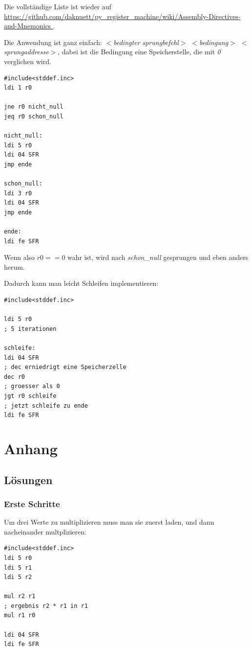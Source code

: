 \documentclass[a4paper,12pt,oneside]{scrreprt}
\begin{document}
Die vollständige Liste ist wieder auf \url{https://github.com/daknuett/py_register_machine/wiki/Assembly-Directives-and-Mnemonics }.

Die Anwendung ist ganz einfach: \textit{$<$bedingter sprungbefehl$>$ $<$bedingung$>$ $<$sprungaddresse$>$}, dabei ist die Bedingung eine Speicherstelle, die mit \textit{0} verglichen wird.

\begin{lstlisting}[frame=single]
#include<stddef.inc>
ldi 1 r0

jne r0 nicht_null
jeq r0 schon_null

nicht_null:
ldi 5 r0
ldi 04 SFR
jmp ende

schon_null:
ldi 3 r0
ldi 04 SFR
jmp ende

ende:
ldi fe SFR
\end{lstlisting}

Wenn also $r0 == 0$ wahr ist, wird nach \textit{schon\_null} gesprungen und eben anders herum.

Dadurch kann man leicht Schleifen implementieren:

\begin{lstlisting}[frame=single]
#include<stddef.inc>

ldi 5 r0
; 5 iterationen

schleife:
ldi 04 SFR
; dec erniedrigt eine Speicherzelle
dec r0
; groesser als 0
jgt r0 schleife
; jetzt schleife zu ende
ldi fe SFR
\end{lstlisting}



\part{Anhang}

\chapter{Lösungen}
\section{Erste Schritte}

Um drei Werte zu multiplizieren muss man sie zuerst laden, und dann nacheinander multplizieren:

\begin{lstlisting}[frame=single]
#include<stddef.inc>
ldi 5 r0
ldi 5 r1
ldi 5 r2

mul r2 r1
; ergebnis r2 * r1 in r1
mul r1 r0

ldi 04 SFR
ldi fe SFR
\end{lstlisting}
\end{document}
